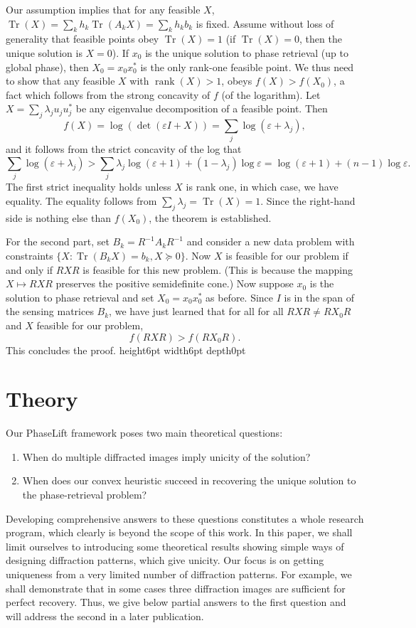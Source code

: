 \documentclass[11pt]{article}
\newcommand{\<}{\langle}
\renewcommand{\>}{\rangle}
\newcommand{\rank}{\operatorname{rank}}
\newcommand{\trace}{\operatorname{Tr}}
\numberwithin{equation}{section}
\def \endprf{\hfill {\vrule height6pt width6pt depth0pt}\medskip}
\newenvironment{proof}{\noindent {\bf Proof} }{\endprf\par}
\renewcommand{\epsilon}{\varepsilon}
\begin{document}
\begin{proof} Our assumption implies that for any feasible $X$,
  $\trace(X) = \sum_k h_k \trace(A_k X) = \sum_k h_k b_k$ is
  fixed. Assume without loss of generality that feasible points obey
  $\trace(X) = 1$ (if $\trace(X) = 0$, then the unique solution is $X
  = 0$). If $x_0$ is the unique solution to phase retrieval (up to
  global phase), then $X_0 = x_0 x_0^*$ is the only rank-one feasible
  point. We thus need to show that any feasible $X$ with $\rank(X) >
  1$, obeys $f(X) > f(X_0)$, a fact which follows from the strong
  concavity of $f$ (of the logarithm). Let $X = \sum_j \lambda_j u_j
  u_j^*$ be any eigenvalue decomposition of a feasible point. Then
\[
f(X) = \log(\det(\epsilon I + X)) = \sum_j \log(\epsilon + \lambda_j),
\]
and it follows from the strict concavity of the log that 
\[
\sum_j \log(\epsilon + \lambda_j) > \sum_j \lambda_j \log(\epsilon +
1) + (1-\lambda_j) \log \epsilon = \log(\epsilon + 1) + (n-1) \log
\epsilon.
\]
The first strict inequality holds unless $X$ is rank one, in which
case, we have equality. The equality follows from $\sum_j \lambda_j =
\trace(X) = 1$. Since the right-hand side is nothing else than
$f(X_0)$, the theorem is established.

For the second part, set $B_k = R^{-1} A_k R^{-1}$ and consider a new
data problem with constraints $\{X: \trace(B_k X) = b_k, X \succeq
0\}$. Now $X$ is feasible for our problem if and only if $RXR$ is
feasible for this new problem. (This is because the mapping $X \mapsto
R X R$ preserves the positive semidefinite cone.) Now suppose $x_0$ is
the solution to phase retrieval and set $X_0 = x_0 x_0^*$ as
before. Since $I$ is in the span of the sensing matrices $B_k$, we
have just learned that for all for all $RXR \neq RX_0R$ and $X$
feasible for our problem,
\[
f(R X R) > f(R X_0 R).
\]
This concludes the proof.
\end{proof}


\section{Theory}
\label{sec:theory}

Our PhaseLift framework poses two main theoretical questions:
\begin{enumerate}
\item When do multiple diffracted images imply unicity of the solution?
\item When does our convex heuristic succeed in recovering the unique
  solution to the phase-retrieval problem?
\end{enumerate}
Developing comprehensive answers to these questions constitutes a
whole research program, which clearly is beyond the scope of this
work. In this paper, we shall limit ourselves to introducing some
theoretical results showing simple ways of designing diffraction
patterns, which give unicity. Our focus is on getting uniqueness from
a very limited number of diffraction patterns.  For example, we shall
demonstrate that in some cases three diffraction images are
sufficient for perfect recovery. Thus, we give below partial answers
to the first question and will address the second in a later
publication.
\end{document}
